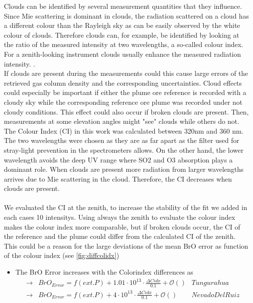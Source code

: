 \documentclass  [
  paper    = a4,
  BCOR     = 10mm,
  twoside,
  fontsize = 12pt,
  fleqn,
  toc      = bibnumbered,
  toc      = listofnumbered,
  numbers  = noendperiod,
  headings = normal,
  listof   = leveldown,
  version  = 3.03
]                                       {scrreprt}
\begin{document}
	Clouds can be identified by several measurement quantities that they influence.
	Since Mie scattering is dominant in clouds, the radiation scattered on a cloud has
	a different colour than the Rayleigh sky as can be easily observed by the white
	colour of clouds. Therefore clouds can, for example, be identified by looking at
	the ratio of the measured intensity at two wavelengths, a so-called colour index.
	For a zenith-looking instrument clouds usually enhance the measured radiation
	intensity. \cite{wagner2014cloud}.\\

	If  clouds  are  present  during  the  measurements could this cause large errors of the retrieved gas column density and the corresponding uncertainties.
	Cloud effects could especially be important if either the plume ore reference is recorded with a cloudy sky while the corresponding reference ore plume was recorded under not cloudy conditions. 
	This effect could also occur if broken clouds are present. Then, measurements at some elevation angles might "see" clouds while others do not.
	\\
	The Colour Index (CI) in this work was calculated between 320nm and 360 nm.
	The two wavelengths were chosen as they are as far apart as the filter used for
	stray-light prevention in the spectrometers allows. On the other hand, the lower
	wavelength avoids the deep UV range where SO2 and O3 absorption plays a
	dominant role. When clouds are present more radiation from larger wavelengths
	arrives due to Mie scattering in the cloud. Therefore, the CI decreases when
	clouds are present. \cite{lubcke2014optical}\\
	\\
	We evaluated the CI at the zenith, to increase the stability of the fit we added in each cases 10 intensitys. Using always the zenith to evaluate the colour index makes the colour index more comparable, but if broken clouds occur, the CI of the reference and the plume could differ from the calculated CI of the zenith. This could be a reason for the large deviations of the mean BrO error as function of the colour index (see \cref{fig:diffcolidx})

	\begin{itemize}
		\item 	The BrO Error increases with the Colorindex differences as \\
		\begin{align*}
		\rightarrow&  BrO_{Error} = f(ext. P)+ 1.01\cdot10^{13}\cdot\frac{\Delta Cidx}{0.1} + \mathcal{O}\left(\right) & Tungurahua\\
		\rightarrow&  BrO_{Error} = f(ext. P)+  4\cdot10^{13}\cdot\frac{\Delta Cidx}{0.1} + \mathcal{O}\left(\right) & Nevado Del Ruiz\\
		\end{align*}
	\end{itemize}
\end{document}
